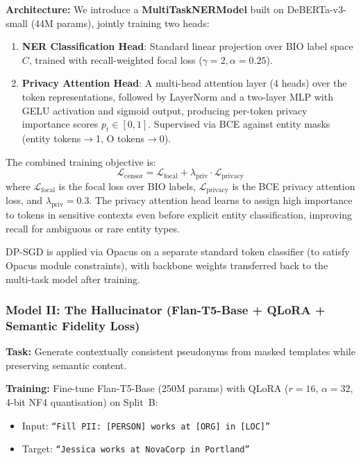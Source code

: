 \documentclass[9pt]{article}
\begin{document}
\textbf{Architecture:} We introduce a \textbf{MultiTaskNERModel} built on DeBERTa-v3-small \cite{he2021debertav3} (44M params), jointly training two heads:
\begin{enumerate}
    \item \textbf{NER Classification Head}: Standard linear projection over BIO label space $C$, trained with recall-weighted focal loss ($\gamma{=}2, \alpha{=}0.25$).
    \item \textbf{Privacy Attention Head}: A multi-head attention layer (4 heads) over the token representations, followed by LayerNorm and a two-layer MLP with GELU activation and sigmoid output, producing per-token privacy importance scores $p_t \in [0,1]$. Supervised via BCE against entity masks (entity tokens$\rightarrow$1, O tokens$\rightarrow$0).
\end{enumerate}
The combined training objective is:
\begin{equation}
    \mathcal{L}_{\text{censor}} = \mathcal{L}_{\text{focal}} + \lambda_{\text{priv}} \cdot \mathcal{L}_{\text{privacy}}
\end{equation}
where $\mathcal{L}_{\text{focal}}$ is the focal loss over BIO labels, $\mathcal{L}_{\text{privacy}}$ is the BCE privacy attention loss, and $\lambda_{\text{priv}}{=}0.3$. The privacy attention head learns to assign high importance to tokens in sensitive contexts even before explicit entity classification, improving recall for ambiguous or rare entity types.

DP-SGD is applied via Opacus on a separate standard token classifier (to satisfy Opacus module constraints), with backbone weights transferred back to the multi-task model after training.

\subsubsection{Model II: The Hallucinator (Flan-T5-Base + QLoRA + Semantic Fidelity Loss)}
\textbf{Task:} Generate contextually consistent pseudonyms from masked templates while preserving semantic content.

\textbf{Training:} Fine-tune Flan-T5-Base (250M params) with QLoRA ($r{=}16$, $\alpha{=}32$, 4-bit NF4 quantisation) on Split~B:
\begin{itemize}
    \item Input: \texttt{``Fill PII: [PERSON] works at [ORG] in [LOC]''}
    \item Target: \texttt{``Jessica works at NovaCorp in Portland''}
\end{itemize}
\end{document}
